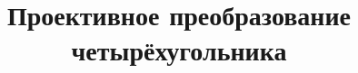 \documentclass[a4paper]{scrartcl}
\begin{document}
\title{Проективное преобразование четырёхугольника}

\stealcurrent
\end{document}

